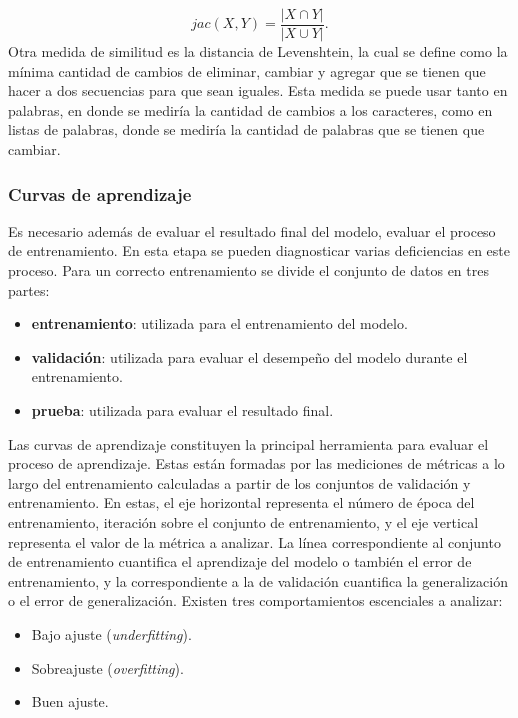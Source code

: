 \begin{equation}
	jac(X, Y) = \frac{|X \cap Y|}{|X \cup Y|}.
\end{equation}
Otra medida de similitud es la distancia de Levenshtein, la cual se define como la mínima cantidad 
de cambios de eliminar, cambiar y agregar que se tienen que hacer a dos secuencias para que sean 
iguales. Esta medida se puede usar tanto en palabras, en donde se mediría la cantidad de cambios 
a los caracteres, como en listas de palabras, donde se mediría la cantidad de palabras que 
se tienen que cambiar. 

\subsubsection{Curvas de aprendizaje}

Es necesario además de evaluar el resultado final del modelo, evaluar el proceso de entrenamiento. En esta etapa 
se pueden diagnosticar varias deficiencias en este proceso. Para un correcto entrenamiento se divide el conjunto de 
datos en tres partes:

\begin{itemize}
	\item \textbf{entrenamiento}: utilizada para el entrenamiento del modelo.
	\item \textbf{validación}: utilizada para evaluar el desempeño del modelo durante el entrenamiento.
	\item \textbf{prueba}: utilizada para evaluar el resultado final.
\end{itemize}

Las curvas de aprendizaje constituyen la principal herramienta para evaluar el proceso de aprendizaje.
Estas están formadas por las mediciones de métricas a lo largo del entrenamiento calculadas a partir de 
los conjuntos de validación y entrenamiento. En estas, el eje horizontal representa el número de época del entrenamiento,
iteración sobre el conjunto de entrenamiento, y el eje vertical representa el valor de la métrica a analizar. 
La línea correspondiente al conjunto de entrenamiento cuantifica 
el aprendizaje del modelo o también el error de entrenamiento, y la correspondiente a la de validación cuantifica 
la generalización o el error de generalización. Existen tres comportamientos escenciales a analizar:

\begin{itemize}
	\item Bajo ajuste (\emph{underfitting}).
	\item Sobreajuste (\emph{overfitting}).
	\item Buen ajuste.
\end{itemize}

